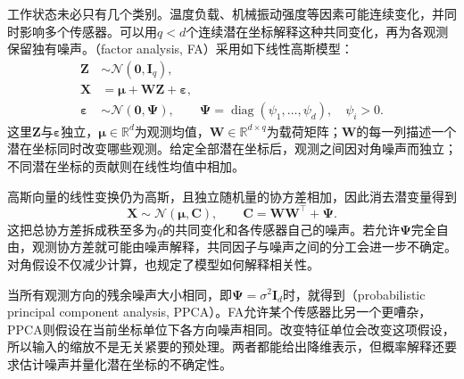 工作状态未必只有几个类别。温度负载、机械振动强度等因素可能连续变化，并同时影响多个传感器。可以用$q<d$个连续潜在坐标解释这种共同变化，再为各观测保留独有噪声。（factor analysis, FA）采用如下线性高斯模型：
\begin{equation}
  \label{eq:pgm-static-directed-fa}
  \begin{aligned}
    \bm{Z}&\sim\mathcal{N}(\bm{0},\bm{I}_q),\\
    \bm{X}&=\bm{\mu}+\bm{W}\bm{Z}+\bm{\varepsilon},\\
    \bm{\varepsilon}&\sim\mathcal{N}(\bm{0},\bm{\Psi}),\qquad
    \bm{\Psi}=\operatorname{diag}(\psi_1,\ldots,\psi_d),
    \quad\psi_i>0.
  \end{aligned}
\end{equation}
这里$\bm{Z}$与$\bm{\varepsilon}$独立，$\bm{\mu}\in\mathbb{R}^{d}$为观测均值，$\bm{W}\in\mathbb{R}^{d\times q}$为载荷矩阵；$\bm{W}$的每一列描述一个潜在坐标同时改变哪些观测。给定全部潜在坐标后，观测之间因对角噪声而独立；不同潜在坐标的贡献则在线性均值中相加。

高斯向量的线性变换仍为高斯，且独立随机量的协方差相加，因此消去潜变量得到
\begin{equation}
  \label{eq:pgm-static-directed-fa-marginal}
  \bm{X}\sim\mathcal{N}(\bm{\mu},\bm{C}),\qquad
  \bm{C}=\bm{W}\bm{W}^{\top}+\bm{\Psi}.
\end{equation}
这把总协方差拆成秩至多为$q$的共同变化和各传感器自己的噪声。若允许$\bm{\Psi}$完全自由，观测协方差就可能由噪声解释，共同因子与噪声之间的分工会进一步不确定。对角假设不仅减少计算，也规定了模型如何解释相关性。

当所有观测方向的残余噪声大小相同，即$\bm{\Psi}=\sigma^2\bm{I}_d$时，就得到（probabilistic principal component analysis, PPCA）。FA允许某个传感器比另一个更嘈杂，PPCA则假设在当前坐标单位下各方向噪声相同。改变特征单位会改变这项假设，所以输入的缩放不是无关紧要的预处理。两者都能给出降维表示，但概率解释还要求估计噪声并量化潜在坐标的不确定性。

